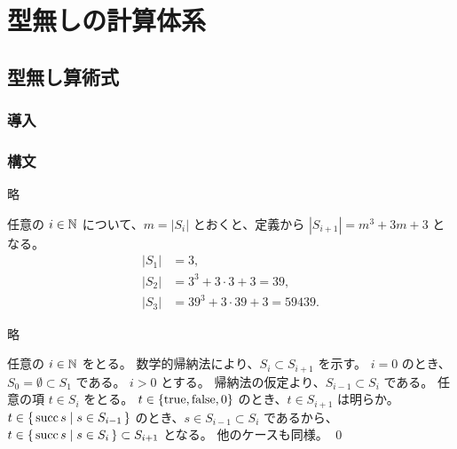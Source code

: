 \part{型無しの計算体系}
\chapter{型無し算術式}
\section{導入}

\section{構文}

\begin{jexercise*}[3.2.4]
  略
\end{jexercise*}
\begin{jproof}
  任意の $i \in \mathbb{N}$ について、$m = |S_i|$ とおくと、定義から $|S_{i+1}| = m^3 + 3m + 3$ となる。
  \begin{align*}
    |S_1| & = 3,
    \\ |S_2| & = 3^3 + 3 \cdot 3 + 3 = 39,
    \\ |S_3| & = 39^3 + 3 \cdot 39 + 3 = 59439.
  \end{align*}
\end{jproof}

\begin{jexercise*}[3.2.5.]
  略
\end{jexercise*}
\begin{jproof}
  任意の $i \in \mathbb{N}$ をとる。
  数学的帰納法により、$S_i \subset S_{i+1}$ を示す。
  $i = 0$ のとき、$S_0 = \emptyset \subset S_1$ である。
  $i > 0$ とする。
  帰納法の仮定より、$S_{i-1} \subset S_i$ である。
  任意の項 $t \in S_i$ をとる。
  $t \in \{\operatorname{true}, \operatorname{false}, 0\}$ のとき、$t \in S_{i+1}$ は明らか。
  $t \in \{\,\operatorname{succ} s \mid s \in S_{i-1}\,\}$ のとき、$s \in S_{i-1} \subset S_i$ であるから、$t \in \{\,\operatorname{succ} s \mid s \in S_i\,\} \subset S_{i+1}$ となる。
  他のケースも同様。
  \qed
\end{jproof}

